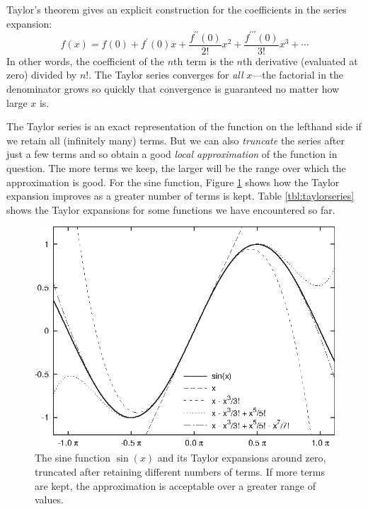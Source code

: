Taylor's theorem gives an explicit construction for the coefficients
in the series expansion:
%
\[
f(x) = f(0) 
     + f^\prime(0) x 
     + \frac{ f^{\prime \prime}(0) }{2!} x^2 
     + \frac{ f^{\prime \prime \prime}(0) }{3!} x^3
     + \dotsb
\]
%
In other words, the coefficient of the $n$th term is the $n$th
derivative (evaluated at zero) divided by $n!$. The Taylor series
converges for \emph{all} $x$---the factorial in the denominator grows
so quickly that convergence is guaranteed no matter how large $x$ is.

The Taylor series is an exact representation of the function on the
lefthand side if we retain all (infinitely many) terms. But we can
also \emph{truncate} the series after just a few terms and so obtain a
good \emph{local approximation} of the function in question. The more
terms we keep, the larger will be the range over which the
approximation is good.  For the sine function, Figure
\ref{fig:taylorseries} shows how the Taylor expansion improves as a
greater number of terms is kept. Table \ref{tbl:taylorseries} shows
the Taylor expansions for some functions we have encountered so far.

\begin{figure}
  \centerline{\includegraphics{img/taylorseries}}
  \caption{The sine function $\sin(x)$ and its Taylor expansions around
    zero, truncated after retaining different numbers of terms. If
    more terms are kept, the approximation is acceptable over a
    greater range of values.}
  \label{fig:taylorseries}\vspace*{-9pt}
\end{figure}

